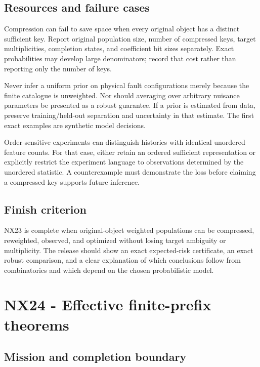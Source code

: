 \documentclass[
  11pt,
  a4paper,
]{report}
\begin{document}
\hypertarget{resources-and-failure-cases}{%
\section{Resources and failure
cases}\label{resources-and-failure-cases}}

Compression can fail to save space when every original object has a
distinct sufficient key. Report original population size, number of
compressed keys, target multiplicities, completion states, and
coefficient bit sizes separately. Exact probabilities may develop large
denominators; record that cost rather than reporting only the number of
keys.

Never infer a uniform prior on physical fault configurations merely
because the finite catalogue is unweighted. Nor should averaging over
arbitrary nuisance parameters be presented as a robust guarantee. If a
prior is estimated from data, preserve training/held-out separation and
uncertainty in that estimate. The first exact examples are synthetic
model decisions.

Order-sensitive experiments can distinguish histories with identical
unordered feature counts. For that case, either retain an ordered
sufficient representation or explicitly restrict the experiment language
to observations determined by the unordered statistic. A counterexample
must demonstrate the loss before claiming a compressed key supports
future inference.

\hypertarget{finish-criterion-3}{%
\section{Finish criterion}\label{finish-criterion-3}}

NX23 is complete when original-object weighted populations can be
compressed, reweighted, observed, and optimized without losing target
ambiguity or multiplicity. The release should show an exact
expected-risk certificate, an exact robust comparison, and a clear
explanation of which conclusions follow from combinatorics and which
depend on the chosen probabilistic model.

\hypertarget{nx24---effective-finite-prefix-theorems}{%
\chapter{NX24 - Effective finite-prefix
theorems}\label{nx24---effective-finite-prefix-theorems}}

\hypertarget{mission-and-completion-boundary-3}{%
\section{Mission and completion
boundary}\label{mission-and-completion-boundary-3}}
\end{document}
